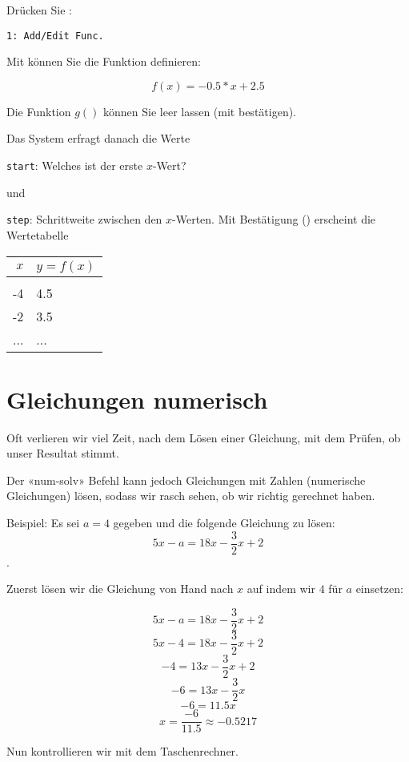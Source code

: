 Drücken Sie :

\texttt{1: Add/Edit Func.}

Mit  können Sie die Funktion definieren:

$$f(x) = -0.5 * x + 2.5$$

Die Funktion $g()$ können Sie leer lassen (mit 
bestätigen).

Das System erfragt danach die Werte

\texttt{start}: Welches ist der erste $x$-Wert?

und

\texttt{step}: Schrittweite zwischen den $x$-Werten. Mit Bestätigung
() erscheint die Wertetabelle

\begin{tabular}{r|l}
$x$ & $y=f(x)$\\
\hline\\
-4 & 4.5\\
-2 & 3.5\\
... &  ... \\
\end{tabular}
\newpage


\section{Gleichungen numerisch}\label{numGleichungen}
Oft verlieren wir viel Zeit, nach dem Lösen einer Gleichung, mit dem Prüfen, ob unser Resultat stimmt.

Der «num-solv» Befehl kann jedoch Gleichungen mit Zahlen (numerische Gleichungen) lösen, sodass wir rasch sehen, ob wir richtig gerechnet haben.

Beispiel: Es sei $a=4$ gegeben und die folgende Gleichung zu lösen: $$5x-a = 18x-\frac32x + 2$$.

Zuerst lösen wir die Gleichung von Hand nach $x$ auf indem wir $4$ für $a$ einsetzen:

$$5x-a = 18x -\frac32x + 2$$
$$5x-4 = 18x -\frac32x + 2$$
$$  -4 = 13x -\frac32x + 2$$
$$  -6 = 13x -\frac32x$$
$$  -6 = 11.5x$$
$$ x = \frac{-6}{11.5}\approx{-0.5217}$$

Nun kontrollieren wir mit dem Taschenrechner.

